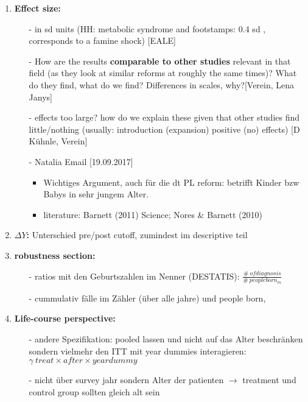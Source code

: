 \documentclass[11pt,a4paper]{article}
\begin{document}
\begin{enumerate}
\item \textbf{Effect size:}\vspace{-1em}
\begin{itemize}
\item[-]in sd units (HH: metabolic syndrome and footstamps: 0.4 sd , corresponds to a famine shock) [EALE]
\item[-] How are the results \textbf{comparable to other studies} relevant in that field (as they look at similar reforms at roughly the same times)? What do they find, what do we find? Differences in scales, why?[Verein, Lena Janys]
\item[-] effects too large? how do we explain these given that other studies find little/nothing (usually: introduction (expansion) positive (no) effects) [D Kühnle, Verein]
\item[-] Natalia Email [19.09.2017]\vspace{-0.5em}
\begin{itemize}
\item Wichtiges Argument, auch für die dt PL reform: betrifft Kinder bzw Babys in sehr jungem Alter.
\item literature: Barnett (2011) Science; Nores \& Barnett (2010) 
\end{itemize}


\end{itemize}


\item \textbf{$\Delta Y$:}\newline
Unterschied pre/post cutoff, zumindest im descriptive teil


\item \textbf{robustness section:}\vspace{-1em}
\begin{itemize}
\item[-] ratios mit den Geburtszahlen im Nenner (DESTATIS): $\frac{\#\ of diagnosis}{\#\ people born_m}$
\item[-] cummulativ fälle im Zähler (über alle jahre) und people born, 
\end{itemize}


\item \textbf{Life-course perspective:}\vspace{-1em}
\begin{itemize}
\item[-]andere Spezifikation: pooled lassen und nicht auf das Alter beschränken sondern vielmehr den ITT mit year dummies interagieren: \newline
$\gamma\  treat \times after \times yeardummy$
\item[-] nicht über survey jahr sondern Alter der patienten $\rightarrow$ treatment und control group sollten gleich alt sein
\end{itemize}



\end{enumerate}
\end{document}
